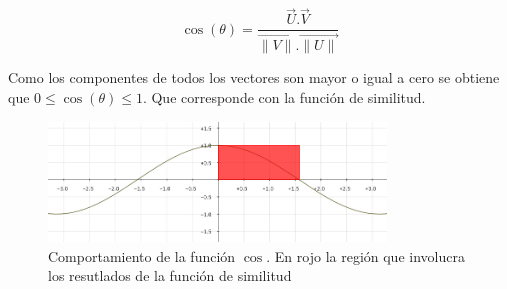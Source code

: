 \begin{equation} \label{eq:angulovectorial}
\cos(\theta) =  \dfrac{\overrightarrow{U} . \overrightarrow{V}}{\overrightarrow{\lVert V\lVert}.\overrightarrow{\lVert U\lVert}}
\end{equation}

Como los componentes de todos los vectores son mayor o igual a cero se obtiene que $0\leq\cos(\theta)\leq1$. Que corresponde con la función de similitud.

\begin{figure}[H]
\includegraphics[width=0.8\textwidth]{img/coseno.png}
\caption{Comportamiento de la función $\cos$. En rojo la región que involucra los resutlados de la función de similitud}
\label{bus:img-coseno}
\end{figure}
